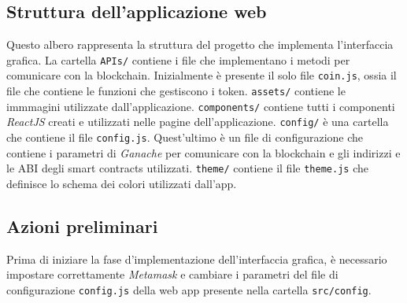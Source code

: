 \documentclass[a4paper]{article}
\begin{document}
        \subsection{Struttura dell'applicazione web}
        Questo albero rappresenta la struttura del progetto che implementa l'interfaccia grafica. La cartella \verb|APIs/| contiene i file che implementano i metodi per comunicare con la blockchain.
        Inizialmente è presente il solo file \verb|coin.js|, ossia il file che contiene le funzioni che gestiscono i token.
        \newline
        \verb|assets/| contiene le immmagini utilizzate dall'applicazione.
        \newline
        \verb|components/| contiene tutti i componenti \emph{ReactJS} creati e utilizzati nelle pagine dell'applicazione.
        \newline
        \verb|config/| è una cartella che contiene il file \verb|config.js|. Quest'ultimo è un file di configurazione che contiene i parametri di \emph{Ganache} per comunicare con la blockchain e gli indirizzi e le ABI degli smart contracts utilizzati.
        \newline
        \verb|theme/| contiene il file \verb|theme.js| che definisce lo schema dei colori utilizzati dall'app.

        \subsection{Azioni preliminari}
        Prima di iniziare la fase d'implementazione dell'interfaccia grafica, è necessario impostare correttamente \emph{Metamask} e cambiare i parametri del file di configurazione \verb|config.js| della web app presente nella cartella \verb|src/config|.
\end{document}
